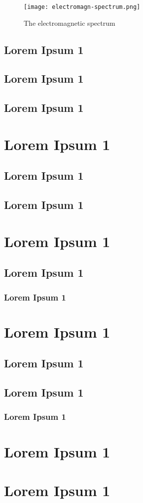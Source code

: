 \begin{figure}[ht]
	\centering
	\texttt{[image: electromagn-spectrum.png]}  
	\caption{The electromagnetic spectrum \citep{lorenz2019}}
	\label{fig:em-spec}
\end{figure}

\subsection{Lorem Ipsum 1}
\subsection{Lorem Ipsum 1}
\subsection{Lorem Ipsum 1}
\section{Lorem Ipsum 1}
\subsection{Lorem Ipsum 1}
\subsection{Lorem Ipsum 1}
\section{Lorem Ipsum 1}
\subsection{Lorem Ipsum 1}
\subsubsection{Lorem Ipsum 1}
\section{Lorem Ipsum 1}
\subsection{Lorem Ipsum 1}
\subsection{Lorem Ipsum 1}
\subsubsection{Lorem Ipsum 1}
\section{Lorem Ipsum 1}
\section{Lorem Ipsum 1}
